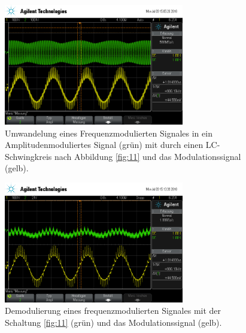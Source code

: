 \begin{figure}
  \centering
  \includegraphics[width=0.7\textwidth]{osci/freq_demod_amp.png}
  \caption{Umwandelung eines Frequenzmodulierten Signales in ein Amplitudenmoduliertes
Signal (grün) mit durch einen LC-Schwingkreis nach Abbildung \ref{fig:11}  und das Modulationssignal (gelb).}
\label{fig:freq_zu_amp}
\end{figure}



\begin{figure}
  \centering
  \includegraphics[width=0.7\textwidth]{osci/freq_demod.png}
  \caption{Demodulierung eines frequenzmodulierten Signales
  mit der Schaltung \ref{fig:11} (grün)  und das Modulationssignal (gelb).}
\label{fig:demod_frequenz}
\end{figure}
